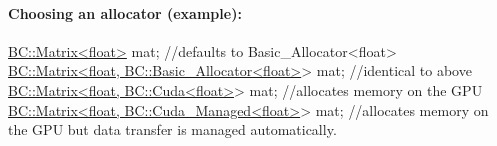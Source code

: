 \paragraph*{Choosing an allocator (example)\+:}


\begin{DoxyCode}
\hyperlink{classBC_1_1tensors_1_1Tensor__Base}{BC::Matrix<float>} mat;                     \textcolor{comment}{//defaults to Basic\_Allocator<float>}
\hyperlink{classBC_1_1tensors_1_1Tensor__Base}{BC::Matrix<float, BC::Basic\_Allocator<float>}> mat; \textcolor{comment}{//identical
       to above   }
\hyperlink{classBC_1_1tensors_1_1Tensor__Base}{BC::Matrix<float, BC::Cuda<float>}> mat;            \textcolor{comment}{//allocates memory on
       the GPU }
\hyperlink{classBC_1_1tensors_1_1Tensor__Base}{BC::Matrix<float, BC::Cuda\_Managed<float>}> mat;    \textcolor{comment}{//allocates
       memory on the GPU but data transfer is managed automatically. }
\end{DoxyCode}
 
